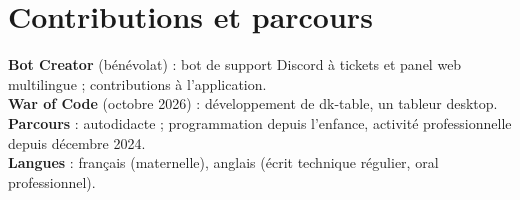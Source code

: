 \documentclass[10pt,a4paper]{article}
\begin{document}
\section{Contributions et parcours}
{\small%
\textbf{Bot Creator} (bénévolat) : bot de support Discord à tickets et panel web multilingue ; contributions à l'application.\\[2pt]%
\textbf{War of Code} (octobre 2026) : développement de dk-table, un tableur desktop.\\[2pt]%
\textbf{Parcours} : autodidacte ; programmation depuis l'enfance, activité professionnelle depuis décembre 2024.\\[2pt]%
\textbf{Langues} : français (maternelle), anglais (écrit technique régulier, oral professionnel).\par}
\end{document}

